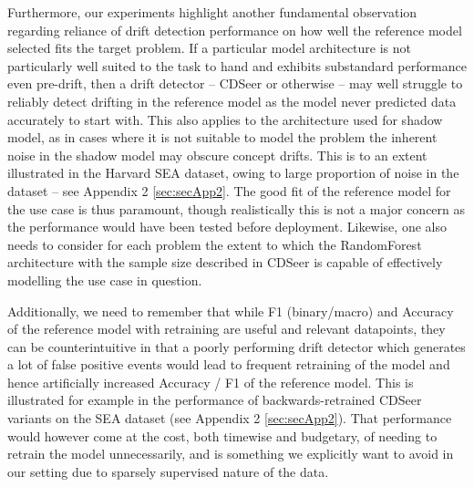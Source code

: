 \documentclass{svproc}
\begin{document}
Furthermore, our experiments highlight another fundamental observation regarding reliance of drift detection performance on how well the reference model selected fits the target problem. If a particular model architecture is not particularly well suited to the task to hand and exhibits substandard performance even pre-drift, then a drift detector – CDSeer or otherwise – may well struggle to reliably detect drifting in the reference model as the model never predicted data accurately to start with. This also applies to the architecture used for shadow model, as in cases where it is not suitable to model the problem the inherent noise in the shadow model may obscure concept drifts. This is to an extent illustrated in the Harvard SEA dataset, owing to large proportion of noise in the dataset – see Appendix 2 \ref{sec:secApp2}. The good fit of the reference model for the use case is thus paramount, though realistically this is not a major concern as the performance would have been tested before deployment. Likewise, one also needs to consider for each problem the extent to which the RandomForest architecture with the sample size described in CDSeer is capable of effectively modelling the use case in question.

Additionally, we need to remember that while F1 (binary/macro) and Accuracy of the reference model with retraining are useful and relevant datapoints, they can be counterintuitive in that a poorly performing drift detector which generates a lot of false positive events would lead to frequent retraining of the model and hence artificially increased Accuracy / F1 of the reference model. This is illustrated for example in the performance of backwards-retrained CDSeer variants on the SEA dataset (see Appendix 2 \ref{sec:secApp2}). That performance would however come at the cost, both timewise and budgetary, of needing to retrain the model unnecessarily, and is something we explicitly want to avoid in our setting due to sparsely supervised nature of the data. 
\end{document}
